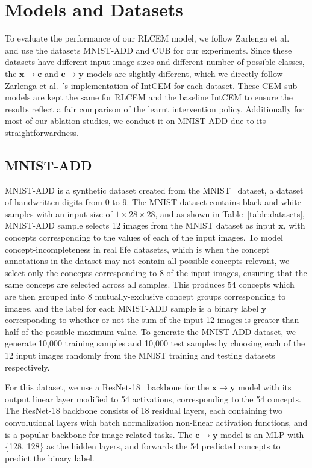 \documentclass[../main.tex]{subfiles}
\begin{document}
\section{Models and Datasets}\label{method:datasets}
To evaluate the performance of our RLCEM model,
we follow Zarlenga et al.~\cite{intcem} and use the datasets MNIST-ADD and CUB for 
our experiments. Since these datasets have different input image sizes
and different number of possible classes,
the $\mathbf{x} \to \mathbf{c}$ and $\mathbf{c} \to \mathbf{y}$ models 
are slightly different, which we directly follow Zarlenga et al.~\cite{intcem}'s 
implementation of IntCEM for each dataset. These CEM sub-models are kept the same
for RLCEM and the baseline IntCEM to ensure the results reflect a fair comparison 
of the learnt intervention policy.
Additionally for most of our ablation studies,
we conduct it on MNIST-ADD due to its straightforwardness.

\subsection{MNIST-ADD}
MNIST-ADD is a synthetic dataset created from 
the MNIST~\cite{mnist} dataset, a dataset of handwritten digits from 0 to 9.
The MNIST dataset contains black-and-white samples with an input size 
of $1 \times 28 \times 28$, and as shown in Table~\ref{table:datasets}, 
MNIST-ADD sample 
selects 12 images from the MNIST dataset as input $\mathbf{x}$,
with concepts corresponding to the values of each of the input images.
To model concept-incompleteness in real life datasetss,
which is when the 
concept annotations in the dataset may not contain all
possible concepts relevant, we select only the concepts corresponding to 8
of the input images, ensuring that the same conceps are selected across
all samples. This produces $54$ concepts which are then grouped into 8 
mutually-exclusive concept groups corresponding to images, 
and the label for each MNIST-ADD sample
is a binary label $\mathbf{y}$ corresponding to whether or not the sum of the input
12 images is greater than half of the possible maximum value.
 To generate the MNIST-ADD dataset,
we generate 10,000 training samples and 10,000 test samples by choosing
each of the 12 input images randomly from the MNIST training and testing
datasets respectively.

For this dataset, we use a ResNet-18~\cite{resnet} backbone for the $\mathbf{x} \to \mathbf{y}$
model with its output linear layer modified to 54 activations, corresponding
to the 54 concepts. The ResNet-18 backbone consists of 18 residual layers,
each containing two convolutional layers with batch normalization non-linear
activation functions, and is a popular backbone for image-related tasks.
The $\mathbf{c} \to \mathbf{y}$ model is an MLP with \{128, 128\} as the hidden
layers, and forwards the 54 predicted concepts to predict the binary label.
\end{document}
